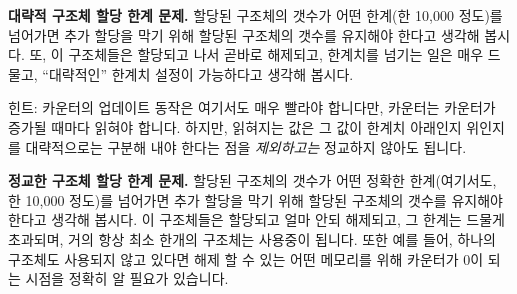 \begin{enumerate}

\QuickQ{}
	{ \bfseries 대략적 구조체 할당 한계 문제. }
	할당된 구조체의 갯수가 어떤 한계(한 10,000 정도)를 넘어가면 추가 할당을
	막기 위해 할당된 구조체의 갯수를 유지해야 한다고 생각해 봅시다.
	또, 이 구조체들은 할당되고 나서 곧바로 해제되고, 한계치를 넘기는 일은
	매우 드물고, ``대략적인'' 한계치 설정이 가능하다고 생각해 봅시다.

\QuickA{}
	힌트: 카운터의 업데이트 동작은 여기서도 매우 빨라야 합니다만, 카운터는
	카운터가 증가될 때마다 읽혀야 합니다.
	하지만, 읽혀지는 값은 그 값이 한계치 아래인지 위인지를 대략적으로는
	구분해 내야 한다는 점을 \emph{제외하고는} 정교하지 않아도 됩니다.

\QuickQ{}
	{ \bfseries 정교한 구조체 할당 한계 문제. }
	할당된 구조체의 갯수가 어떤 정확한 한계(여기서도, 한 10,000 정도)를
	넘어가면 추가 할당을 막기 위해 할당된 구조체의 갯수를 유지해야 한다고
	생각해 봅시다.
	이 구조체들은 할당되고 얼마 안되 해제되고, 그 한계는 드물게 초과되며,
	거의 항상 최소 한개의 구조체는 사용중이 됩니다. 또한 예를 들어, 하나의
	구조체도 사용되지 않고 있다면 해제 할 수 있는 어떤 메모리를 위해
	카운터가 0이 되는 시점을 정확히 알 필요가 있습니다.
	\iffalse


\end{enumerate}
